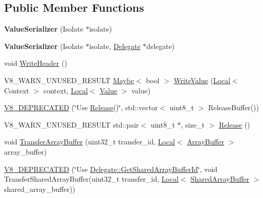 \subsection*{Public Member Functions}
\begin{DoxyCompactItemize}
\item 
\mbox{\label{classv8_1_1ValueSerializer_a51d1b6f00c48dc3577baeeaa3bdbaf09}} 
{\bfseries Value\+Serializer} (Isolate $\ast$isolate)
\item 
\mbox{\label{classv8_1_1ValueSerializer_a5f37e7f6087acda9a943fb50216e0895}} 
{\bfseries Value\+Serializer} (Isolate $\ast$isolate, \mbox{\hyperlink{classv8_1_1ValueSerializer_1_1Delegate}{Delegate}} $\ast$delegate)
\item 
void \mbox{\hyperlink{classv8_1_1ValueSerializer_ac0bdf1a7731ee4e93823dabdfa8c8661}{Write\+Header}} ()
\item 
V8\+\_\+\+W\+A\+R\+N\+\_\+\+U\+N\+U\+S\+E\+D\+\_\+\+R\+E\+S\+U\+LT \mbox{\hyperlink{classv8_1_1Maybe}{Maybe}}$<$ bool $>$ \mbox{\hyperlink{classv8_1_1ValueSerializer_a32b08083cb7d83bf3b117b61f327ea23}{Write\+Value}} (\mbox{\hyperlink{classv8_1_1Local}{Local}}$<$ Context $>$ context, \mbox{\hyperlink{classv8_1_1Local}{Local}}$<$ \mbox{\hyperlink{classv8_1_1Value}{Value}} $>$ value)
\item 
\mbox{\hyperlink{classv8_1_1ValueSerializer_a64a2c151142bc706a446d15599541ca4}{V8\+\_\+\+D\+E\+P\+R\+E\+C\+A\+T\+ED}} (\char`\"{}Use \mbox{\hyperlink{classv8_1_1ValueSerializer_abab0c48c963cd11f98478a4ccc04509c}{Release}}()\char`\"{}, std\+::vector$<$ uint8\+\_\+t $>$ Release\+Buffer())
\item 
V8\+\_\+\+W\+A\+R\+N\+\_\+\+U\+N\+U\+S\+E\+D\+\_\+\+R\+E\+S\+U\+LT std\+::pair$<$ uint8\+\_\+t $\ast$, size\+\_\+t $>$ \mbox{\hyperlink{classv8_1_1ValueSerializer_abab0c48c963cd11f98478a4ccc04509c}{Release}} ()
\item 
void \mbox{\hyperlink{classv8_1_1ValueSerializer_a27007f2530a496275ccf7b8846f1d9c5}{Transfer\+Array\+Buffer}} (uint32\+\_\+t transfer\+\_\+id, \mbox{\hyperlink{classv8_1_1Local}{Local}}$<$ \mbox{\hyperlink{classv8_1_1ArrayBuffer}{Array\+Buffer}} $>$ array\+\_\+buffer)
\item 
\mbox{\hyperlink{classv8_1_1ValueSerializer_a4f7e5fe4298a8094817fe9f639112499}{V8\+\_\+\+D\+E\+P\+R\+E\+C\+A\+T\+ED}} (\char`\"{}Use \mbox{\hyperlink{classv8_1_1ValueSerializer_1_1Delegate_a963946ef185d992552e8d9e0e4016137}{Delegate\+::\+Get\+Shared\+Array\+Buffer\+Id}}\char`\"{}, void Transfer\+Shared\+Array\+Buffer(uint32\+\_\+t transfer\+\_\+id, \mbox{\hyperlink{classv8_1_1Local}{Local}}$<$ \mbox{\hyperlink{classv8_1_1SharedArrayBuffer}{Shared\+Array\+Buffer}} $>$ shared\+\_\+array\+\_\+buffer))

\end{DoxyCompactItemize}
